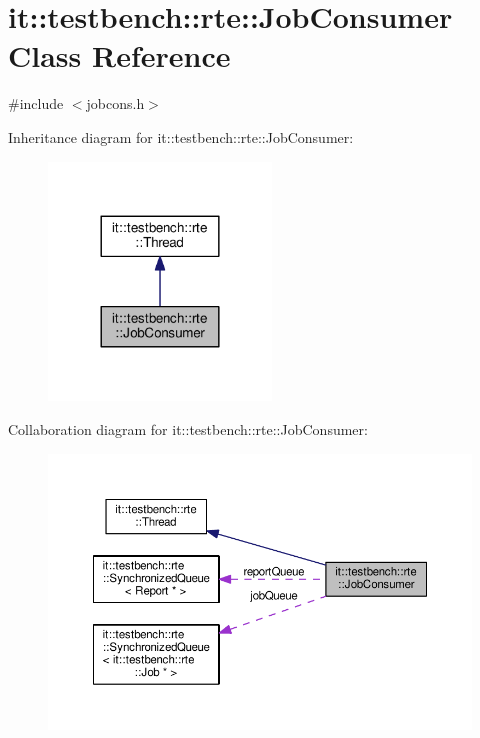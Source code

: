 \hypertarget{classit_1_1testbench_1_1rte_1_1JobConsumer}{\section{it\-:\-:testbench\-:\-:rte\-:\-:Job\-Consumer Class Reference}
\label{dc/d6e/classit_1_1testbench_1_1rte_1_1JobConsumer}
}


{\ttfamily \#include $<$jobcons.\-h$>$}



Inheritance diagram for it\-:\-:testbench\-:\-:rte\-:\-:Job\-Consumer\-:
\nopagebreak
\begin{figure}[H]
\begin{center}
\leavevmode
\includegraphics[width=168pt]{d3/d0e/classit_1_1testbench_1_1rte_1_1JobConsumer__inherit__graph}
\end{center}
\end{figure}


Collaboration diagram for it\-:\-:testbench\-:\-:rte\-:\-:Job\-Consumer\-:
\nopagebreak
\begin{figure}[H]
\begin{center}
\leavevmode
\includegraphics[width=350pt]{dd/df3/classit_1_1testbench_1_1rte_1_1JobConsumer__coll__graph}
\end{center}
\end{figure}
